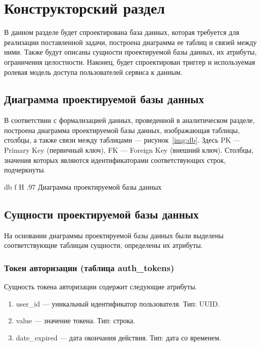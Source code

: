 \chapter{Конструкторский раздел}

В данном разделе будет спроектирована база данных, которая требуется для реализации поставленной задачи, построена диаграмма ее таблиц и связей между ними. Также будут описаны сущности проектируемой базы данных, их атрибуты, ограничения целостности. Наконец, будет спроектирован триггер и используемая ролевая модель доступа пользователей сервиса к данным.

\section{Диаграмма проектируемой базы данных}

В соответствии с формализацией данных, проведенной в аналитическом разделе, построена диаграмма проектируемой базы данных, изображающая таблицы, столбцы, а также связи между таблицами --- рисунок~\ref{img:db}. Здесь PK --- Primary Key (первичный ключ), FK --- Foreign Key (внешний ключ). Столбцы, значения которых являются идентификаторами соответствующих строк, подчеркнуты.

{db}
{f}
{H}
{.97\textwidth}
{Диаграмма проектируемой базы данных}

\section{Сущности проектируемой базы данных}

На основании диаграммы проектируемой базы данных были выделены соответствующие таблицам сущности, определены их атрибуты.

\subsection*{Токен авторизации (таблица auth\_tokens)}

Сущность токена авторизации содержит следующие атрибуты.

\begin{enumerate}
	\item user\_id --- уникальный идентификатор пользователя. Тип: UUID.
	\item value --- значение токена. Тип: строка.
	\item date\_expired --- дата окончания действия. Тип: дата со временем.
\end{enumerate}

